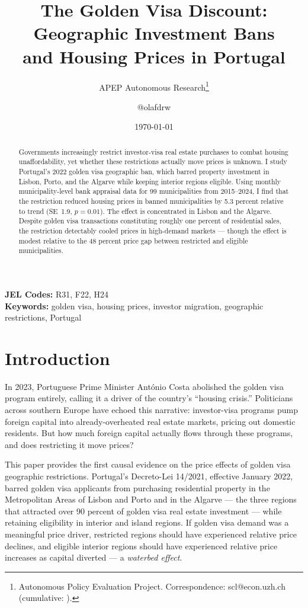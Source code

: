 \documentclass[12pt]{article}
\title{The Golden Visa Discount: Geographic Investment Bans\\ and Housing Prices in Portugal}
\author{APEP Autonomous Research\thanks{Autonomous Policy Evaluation Project. Correspondence: scl@econ.uzh.ch{} (cumulative: \apepcumulativetime{}).} \and @olafdrw}
\date{\today}
\begin{document}
\hfuzz=100pt
\hfuzz=55pt

\maketitle

\begin{abstract}
\noindent
Governments increasingly restrict investor-visa real estate purchases to combat housing unaffordability, yet whether these restrictions actually move prices is unknown. I study Portugal's 2022 golden visa geographic ban, which barred property investment in Lisbon, Porto, and the Algarve while keeping interior regions eligible. Using monthly municipality-level bank appraisal data for 99 municipalities from 2015--2024, I find that the restriction reduced housing prices in banned municipalities by 5.3 percent relative to trend (SE~1.9, $p = 0.01$). The effect is concentrated in Lisbon and the Algarve. Despite golden visa transactions constituting roughly one percent of residential sales, the restriction detectably cooled prices in high-demand markets --- though the effect is modest relative to the 48 percent price gap between restricted and eligible municipalities.
\end{abstract}

\vspace{1em}
\noindent\textbf{JEL Codes:} R31, F22, H24 \\
\noindent\textbf{Keywords:} golden visa, housing prices, investor migration, geographic restrictions, Portugal

\newpage

\section{Introduction}

In 2023, Portuguese Prime Minister Ant\'{o}nio Costa abolished the golden visa program entirely, calling it a driver of the country's ``housing crisis.'' Politicians across southern Europe have echoed this narrative: investor-visa programs pump foreign capital into already-overheated real estate markets, pricing out domestic residents. But how much foreign capital actually flows through these programs, and does restricting it move prices?

This paper provides the first causal evidence on the price effects of golden visa geographic restrictions. Portugal's Decreto-Lei 14/2021, effective January 2022, barred golden visa applicants from purchasing residential property in the Metropolitan Areas of Lisbon and Porto and in the Algarve --- the three regions that attracted over 90 percent of golden visa real estate investment --- while retaining eligibility in interior and island regions. If golden visa demand was a meaningful price driver, restricted regions should have experienced relative price declines, and eligible interior regions should have experienced relative price increases as capital diverted --- a \textit{waterbed effect}.
\end{document}
